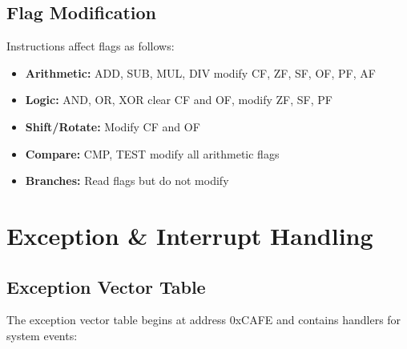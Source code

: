 \documentclass[12pt]{article}
\begin{document}
\subsection{Flag Modification}

Instructions affect flags as follows:

\begin{itemize}
    \item \textbf{Arithmetic:} ADD, SUB, MUL, DIV modify CF, ZF, SF, OF, PF, AF
    \item \textbf{Logic:} AND, OR, XOR clear CF and OF, modify ZF, SF, PF
    \item \textbf{Shift/Rotate:} Modify CF and OF
    \item \textbf{Compare:} CMP, TEST modify all arithmetic flags
    \item \textbf{Branches:} Read flags but do not modify
\end{itemize}

\section{Exception \& Interrupt Handling}

\subsection{Exception Vector Table}

The exception vector table begins at address 0xCAFE and contains handlers for system events:
\end{document}
